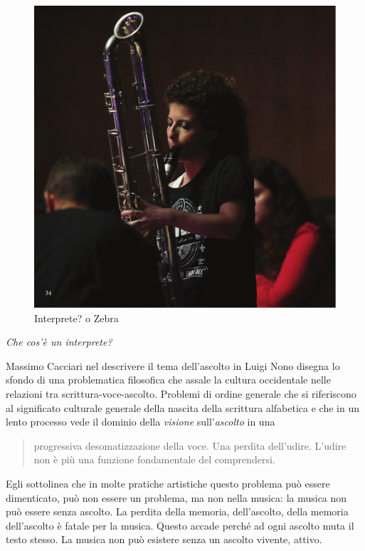 \documentclass{gs-adonis}
\begin{document}
\begin{figure}[ht]
  \centering
  \includegraphics[width=\linewidth]{images/panthera.pdf}
  \captionsetup{width=.81\linewidth}
  \caption{Interprete? o Zebra}
  \label{alice}
\end{figure}

\emph{Che cos'è un interprete?}

Massimo Cacciari nel descrivere il tema dell'ascolto in Luigi Nono
\cite{Cacciari1995} disegna lo sfondo di una problematica filosofica che assale
la cultura occidentale nelle relazioni tra scrittura-voce-ascolto. Problemi di
ordine generale che si riferiscono al significato culturale generale della
nascita della scrittura alfabetica e che in un lento processo vede il dominio
della \emph{visione} sull'\emph{ascolto} in una

\begin{quote}
  progressiva desomatizzazione della voce. Una perdita dell'udire. L'udire
  non è più una funzione fondamentale del comprendersi. \cite{Cacciari1995}
\end{quote}

Egli sottolinea che in molte pratiche artistiche questo problema può essere
dimenticato, può non essere un problema, ma non nella musica: la musica non può
essere senza ascolto. La perdita della memoria, dell'ascolto, della memoria
dell'ascolto è fatale per la musica. Questo accade perché ad ogni ascolto muta
il testo stesso. La musica non può esistere senza un ascolto vivente, attivo.
\end{document}
